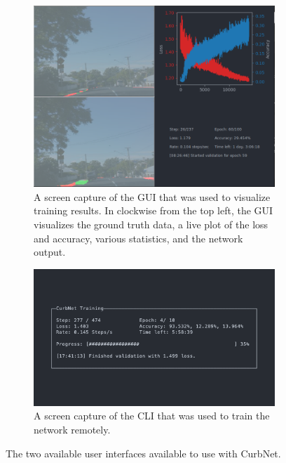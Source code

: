 \begin{figure}
	\centering
	\begin{subfigure}{0.45\textwidth}
		\includegraphics[width=\linewidth]{figures/experiments/gui.png}
		\caption[Training GUI]{A screen capture of the GUI that was used to visualize training results. In clockwise from the top left, the GUI visualizes the ground truth data, a live plot of the loss and accuracy, various statistics, and the network output.}
		\label{fig:experiments-gui}
	\end{subfigure}
	\hfill
	\begin{subfigure}{0.45\textwidth}
		\includegraphics[width=\linewidth]{figures/experiments/cli.png}
		\caption[Training CLI]{A screen capture of the CLI that was used to train the network remotely.}
		\label{fig:experiments-cli}
	\end{subfigure}
	\caption[Training UI]{The two available user interfaces available to use with CurbNet.}
\end{figure}